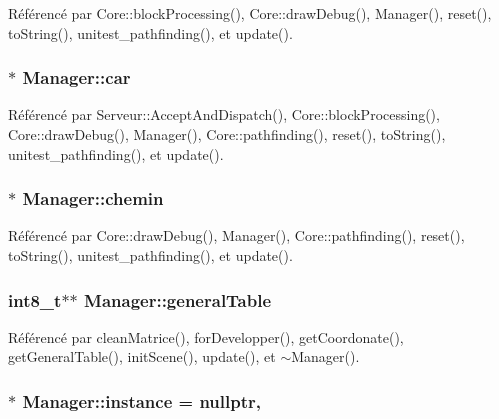 Référencé par Core\-::block\-Processing(), Core\-::draw\-Debug(), Manager(), reset(), to\-String(), unitest\-\_\-pathfinding(), et update().

\hypertarget{classManager_a2803dff8e8f2912242f4098991d91415}{
\subsubsection[{car}]{$\ast$ Manager\-::car}}\label{classManager_a2803dff8e8f2912242f4098991d91415}


Référencé par Serveur\-::\-Accept\-And\-Dispatch(), Core\-::block\-Processing(), Core\-::draw\-Debug(), Manager(), Core\-::pathfinding(), reset(), to\-String(), unitest\-\_\-pathfinding(), et update().

\hypertarget{classManager_abaeefec28074459f6dbdc64af9c6a3b9}{
\subsubsection[{chemin}]{$\ast$ Manager\-::chemin}}\label{classManager_abaeefec28074459f6dbdc64af9c6a3b9}


Référencé par Core\-::draw\-Debug(), Manager(), Core\-::pathfinding(), reset(), to\-String(), unitest\-\_\-pathfinding(), et update().

\hypertarget{classManager_ad5d59f4a2b1de265115f4efbbbc60dcd}{
\subsubsection[{general\-Table}]{\setlength{\rightskip}{0pt plus 5cm}int8\-\_\-t$\ast$$\ast$ Manager\-::general\-Table\hspace{0.3cm}{\ttfamily [private]}}}\label{classManager_ad5d59f4a2b1de265115f4efbbbc60dcd}


Référencé par clean\-Matrice(), for\-Developper(), get\-Coordonate(), get\-General\-Table(), init\-Scene(), update(), et $\sim$\-Manager().

\hypertarget{classManager_ac80f5ee151565f111593921bac645ad7}{
\subsubsection[{instance}]{ $\ast$ Manager\-::instance = nullptr\hspace{0.3cm}{\ttfamily [static]}, {\ttfamily [private]}}}\label{classManager_ac80f5ee151565f111593921bac645ad7}


